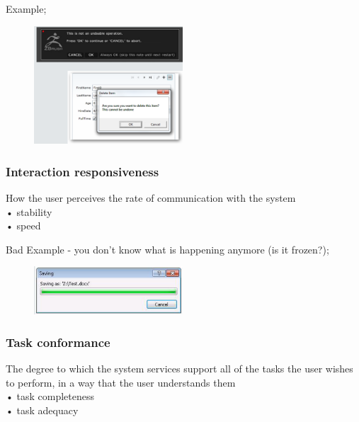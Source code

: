 \documentclass[]{project_plan}
\begin{document}
Example;
\begin{figure}[h!]
  \centering
  \includegraphics[width=15em]{recoverability_example.png}
\end{figure}

\subsubsection{Interaction responsiveness}
How the user perceives the rate of communication with the system\\
• stability\\
• speed

Bad Example - you don't know what is happening anymore (is it frozen?);
\begin{figure}[h!]
  \centering
  \includegraphics[width=15em]{interaction_responsiveness_example.png}
\end{figure}

\newpage

\subsubsection{Task conformance}
The degree to which the system services support all of the tasks the user
wishes to perform, in a way that the user understands them\\
• task completeness\\
• task adequacy
\end{document}

